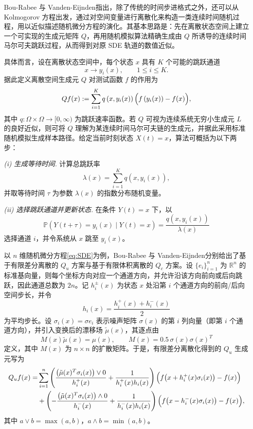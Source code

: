 Bou-Rabee 与 Vanden-Eijnden\cite{bou2018continuous}指出，除了传统的时间步进格式之外，还可以从 Kolmogorov 方程出发，通过对空间变量进行离散化来构造一类连续时间随机过程，用以近似描述随机微分方程的演化。其基本思路是：先在离散状态空间上建立一个可实现的生成元矩阵 $Q$，再用随机模拟算法精确生成由 $Q$ 所诱导的连续时间马尔可夫跳跃过程，从而得到对原 SDE 轨道的数值近似。

具体而言，设在离散状态空间中，每个状态 $x$ 具有 $K$ 个可能的跳跃通道
\[
x\rightarrow y_i(x),\qquad 1\le i\le K.
\]
据此定义离散空间生成元 $Q$ 对测试函数 $f$ 的作用为
\begin{equation}\label{eq:Qf(x)_rewrite}
	Q f(x):=\sum_{i=1}^{K} q\left(x, y_{i}(x)\right)\Bigl(f\left(y_{i}(x)\right)-f(x)\Bigr),
\end{equation}
其中 $q:\Omega\times\Omega\to[0,\infty)$ 为跳跃速率函数。若 $Q$ 可视为连续系统无穷小生成元 $L$ 的良好近似，则可将 $Q$ 理解为某连续时间马尔可夫链的生成元，并据此采用标准随机模拟生成样本路径。给定当前时刻状态 $X(t)=x$，算法可概括为以下两步：

\emph{(i) 生成等待时间.} 计算总跳跃率
\[
\lambda(x)=\sum_{i=1}^{K} q\left(x, y_{i}(x)\right),
\]
并取等待时间 $\tau$ 为参数 $\lambda(x)$ 的指数分布随机变量。

\emph{(ii) 选择跳跃通道并更新状态.} 在条件 $Y(t)=x$ 下，以
\[
\mathbb{P}\!\left(Y(t+\tau)=y_{i}(x)\mid Y(t)=x\right)
=\frac{q\left(x, y_{i}(x)\right)}{\lambda(x)}
\]
选择通道 $i$，并令系统从 $x$ 跳至 $y_i(x)$。

以 $n$ 维随机微分方程\eqref{eq:SDE}为例，Bou-Rabee 与 Vanden-Eijnden\cite{bou2018continuous}分别给出了基于有限差分离散的 $Q_u$ 方案与基于有限体积离散的 $Q_c$ 方案。设 $\{e_i\}_{i=1}^n$ 为 $\mathbb{R}^n$ 的标准基向量，则每个坐标方向对应一个通道方向，并允许沿该方向前向或后向跳跃，因此通道总数为 $2n$。记 $h_i^{\pm}(x)$ 为状态 $x$ 处沿第 $i$ 个通道方向的前向/后向空间步长，并令
\[
h_i(x)=\frac{h_i^{+}(x)+h_i^{-}(x)}{2}
\]
为平均步长。设 $\sigma_i(x)=\sigma e_i$ 表示噪声矩阵 $\sigma(x)$ 的第 $i$ 列向量（即第 $i$ 个通道方向），并引入变换后的漂移场 $\tilde{\mu}(x)$，其逐点由
\[
M(x)\tilde{\mu}(x)=\mu(x),\qquad M(x)=0.5\,\sigma(x)\sigma(x)^T
\]
定义，其中 $M(x)$ 为 $n\times n$ 的扩散矩阵。于是，有限差分离散化得到的 $Q_u$ 生成元写为
\begin{align}\label{algorithm:Q_u_rewrite}
	Q_{u} f(x)= & \sum_{i=1}^{n}\left(\frac{\left(\tilde{\mu}(x)^{T} \sigma_{i}(x)\right) \vee 0}{h_{i}^{+}(x)}+\frac{1}{h_{i}^{+}(x) h_{i}(x)}\right)\Bigl(f\bigl(x+h_{i}^{+}(x) \sigma_{i}(x)\bigr)-f(x)\Bigr) \notag \\
	& +\left(-\frac{\left(\tilde{\mu}(x)^{T} \sigma_{i}(x)\right) \wedge 0}{h_{i}^{-}(x)}+\frac{1}{h_{i}^{-}(x) h_{i}(x)}\right)\Bigl(f\bigl(x-h_{i}^{-}(x) \sigma_{i}(x)\bigr)-f(x)\Bigr),
\end{align}
其中 $a\vee b=\max(a,b)$，$a\wedge b=\min(a,b)$。

